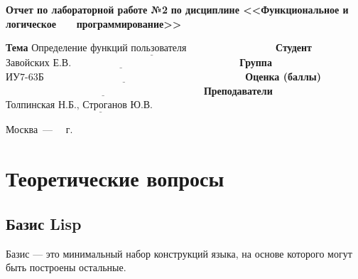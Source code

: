 \documentclass[12pt]{report}
\begin{document}
\begin{titlepage}
		\begin{center}
			\noindent\begin{minipage}{1.1\textwidth}\centering
				\Large\textbf{  Отчет по лабораторной работе №2}\newline
				\textbf{по дисциплине <<Функциональное и логическое}\newline
				\textbf{~~~программирование>>}\newline\newline
			\end{minipage}
		\end{center}
		
		\noindent\textbf{Тема} $\underline{\text{Определение функций пользователя~~~~~~~~~~~~~~~~~~~~~~~~~~}}$\newline\newline
		\noindent\textbf{Студент} $\underline{\text{Завойских Е.В.~~~~~~~~~~~~~~~~~~~~~~~~~~~~~~~~~~~~~~~~~~~~~~~~~~}}$\newline\newline
		\noindent\textbf{Группа} $\underline{\text{ИУ7-63Б~~~~~~~~~~~~~~~~~~~~~~~~~~~~~~~~~~~~~~~~~~~~~~~~~~~~~~~~~~~~}}$\newline\newline
		\noindent\textbf{Оценка (баллы)} $\underline{\text{~~~~~~~~~~~~~~~~~~~~~~~~~~~~~~~~~~~~~~~~~~~~~~~~~~~~~~~~~~~}}$\newline\newline
		\noindent\textbf{Преподаватели} $\underline{\text{Толпинская Н.Б., Строганов Ю.В.~~~~~~~~~~~~~}}$\newline\newline\newline
		
		\begin{center}
			\vfill
			Москва~---~\the\year
			~г.
		\end{center}
	\end{titlepage}
	
\chapter{Теоретические вопросы}
	
\section{Базис Lisp}

Базис --- это минимальный набор конструкций языка, на основе которого могут быть построены остальные.
\end{document}
